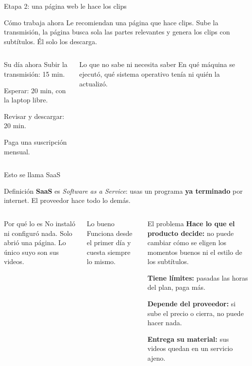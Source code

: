 \documentclass[aspectratio=169,10pt,c]{beamer}
\begin{document}
\begin{frame}{Etapa 2: una página web le hace los clips}
\begin{block}{Cómo trabaja ahora}
\small Le recomiendan una página que hace clips. Sube la transmisión, la página busca sola las partes relevantes y genera los clips con subtítulos. Él solo los descarga.
\end{block}
\begin{columns}[T,onlytextwidth]
\begin{exampleblock}{Su día ahora}
\small
Subir la transmisión: 15 min.\par\smallskip
Esperar: 20 min, con la laptop libre.\par\smallskip
Revisar y descargar: 20 min.\par\smallskip
Paga una suscripción mensual.
\end{exampleblock}
\begin{block}{Lo que no sabe ni necesita saber}
\small En qué máquina se ejecutó, qué sistema operativo tenía ni quién la actualizó.
\end{block}
\end{columns}
\end{frame}

\begin{frame}{Esto se llama SaaS}
\begin{block}{Definición}
\small \textbf{SaaS} es \emph{Software as a Service}: usas un programa \textbf{ya terminado} por internet. El proveedor hace todo lo demás.
\end{block}
\begin{columns}[T,onlytextwidth]
\begin{exampleblock}{Por qué lo es}
\small No instaló ni configuró nada. Solo abrió una página. Lo único suyo son sus videos.
\end{exampleblock}
\begin{block}{Lo bueno}
\small Funciona desde el primer día y cuesta siempre lo mismo.
\end{block}
\begin{alertblock}{El problema}
\small
\textbf{Hace lo que el producto decide:} no puede cambiar cómo se eligen los momentos buenos ni el estilo de los subtítulos.\par\smallskip
\textbf{Tiene límites:} pasadas las horas del plan, paga más.\par\smallskip
\textbf{Depende del proveedor:} si sube el precio o cierra, no puede hacer nada.\par\smallskip
\textbf{Entrega su material:} sus videos quedan en un servicio ajeno.
\end{alertblock}
\end{columns}
\end{frame}
\end{document}
